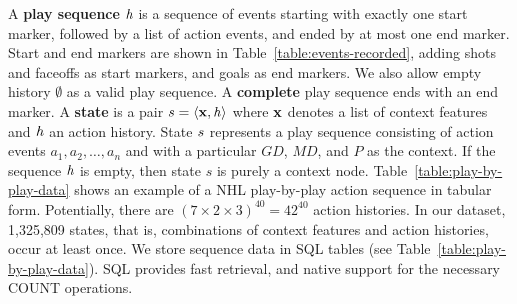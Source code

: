 \documentclass[]{article}
\begin{document}
A \textbf{play sequence} $\it{h}$ is a sequence of events starting with exactly one start marker, followed by a list of action events, and ended by at most one end marker.  Start and end markers are shown in Table~\ref{table:events-recorded}, adding shots and faceoffs as start markers, and goals as end markers. We also allow empty history $\emptyset$ as a valid play sequence. A \textbf{complete} play sequence ends with an end marker.
A \textbf{state} is a pair $s = \langle \mathbf{x}, \it{h} \rangle$ where $\mathbf{x}$ denotes a list of context features and $\it{h}$ an action history. State $s$ represents a play sequence consisting of action events $a_1,a_2,\ldots,a_n$ and with a particular $GD$, $MD$, and $P$ as the context. If the sequence $\it{h}$ is empty, then state $s$ is purely a context node. Table~\ref{table:play-by-play-data} shows an example of a NHL play-by-play action sequence in tabular form. Potentially, there are $(7 \times 2 \times 3)^{40} = 42^{40}$ action histories. In our dataset, 1,325,809 states, that is, combinations of context features and action histories, occur at least once. %
We store sequence data in SQL tables (see Table~\ref{table:play-by-play-data}). SQL provides fast retrieval,  and  native support for the necessary COUNT operations.



\begin{table}[htb]
\caption{Sample Play-By-Play Data in Tabular Format}
\label{table:play-by-play-data}
\begin{center}
\end{center}
\end{table}
\end{document}
